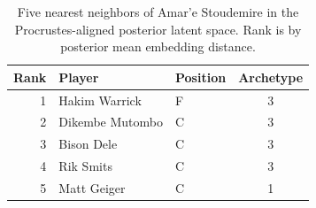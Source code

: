 \begin{table}[htbp]
  \centering\small
  \begin{tabular}{rllc}
    \toprule
    Rank & Player & Position & Archetype \\
    \midrule
    1 & Hakim Warrick & F & 3 \\
    2 & Dikembe Mutombo & C & 3 \\
    3 & Bison Dele & C & 3 \\
    4 & Rik Smits & C & 3 \\
    5 & Matt Geiger & C & 1 \\
    \bottomrule
  \end{tabular}
  \caption{Five nearest neighbors of Amar'e Stoudemire in the Procrustes-aligned posterior latent space. Rank is by posterior mean embedding distance.}
  \label{tab:Amar_e_Stoudemire_neighbors}
\end{table}

